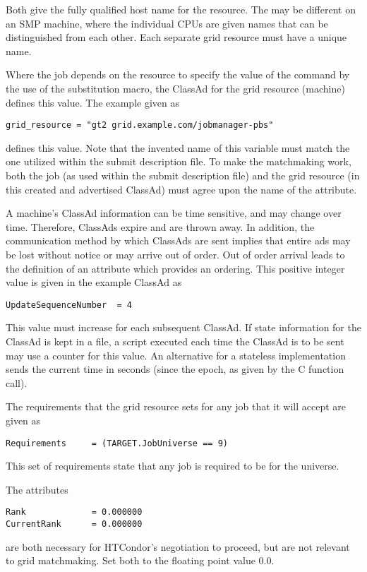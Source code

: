 Both give the fully qualified host name for the resource.
The  may be different on an SMP machine,
where the individual CPUs are given names that can
be distinguished from each other.
Each separate grid resource must have a unique name.

Where the job depends on the resource to specify the
value of the  command by
the use of the substitution macro,
the ClassAd for the grid resource (machine)
defines this value.
The example given as
\footnotesize
\begin{verbatim}
grid_resource = "gt2 grid.example.com/jobmanager-pbs"
\end{verbatim}
\normalsize
defines this value.
Note that the invented name of this variable must match the
one utilized within the submit description file.
To make the matchmaking work,
both the job (as used within the submit description file)
and the grid resource (in this created and advertised ClassAd)
must agree upon the name of the attribute.

A machine's ClassAd information can be time sensitive,
and may change over time.
Therefore, ClassAds expire and are thrown away.
In addition, the communication method by which ClassAds
are sent implies that entire ads may be lost without notice
or may arrive out of order.
Out of order arrival leads to the definition of an
attribute which provides an ordering.
This positive integer value is given in the example
ClassAd as
\footnotesize
\begin{verbatim}
UpdateSequenceNumber  = 4
\end{verbatim}
\normalsize
This value must increase for each subsequent ClassAd.
If state information for the ClassAd is kept in a file,
a script executed each time the ClassAd is to be sent
may use a counter for this value.
An alternative for a stateless implementation sends
the current time in seconds (since the epoch, as given by
the C  function call).

The requirements that the grid resource sets for any job
that it will accept are given as
\footnotesize
\begin{verbatim}
Requirements     = (TARGET.JobUniverse == 9)
\end{verbatim}
\normalsize
This set of requirements state that any job is
required to be for the  universe.

The attributes
\footnotesize
\begin{verbatim}
Rank             = 0.000000
CurrentRank      = 0.000000
\end{verbatim}
\normalsize
are both necessary for HTCondor's negotiation to proceed,
but are not relevant to grid matchmaking.
Set both to the floating point value 0.0.


